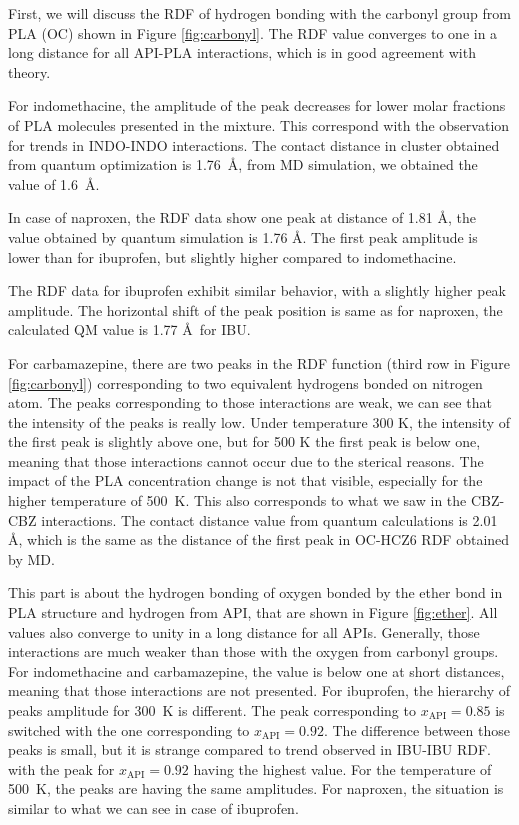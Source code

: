 \newpage
First, we will discuss the RDF of hydrogen bonding with the carbonyl group from PLA (OC) shown in Figure \ref{fig:carbonyl}. The RDF value converges to one in a long distance for all API-PLA interactions, which is in good agreement with theory. 

For indomethacine, the amplitude of the peak decreases for lower molar fractions of PLA molecules presented in the mixture. This correspond with the observation for trends in INDO-INDO interactions. The contact distance in cluster obtained from quantum optimization is 1.76~\AA, from MD simulation, we obtained the value of 1.6~\AA.

In case of naproxen, the RDF data show one peak at distance of 1.81 \AA, the value obtained by quantum simulation is 1.76 \AA. The first peak amplitude is lower than for ibuprofen, but slightly higher compared to indomethacine. 

The RDF data for ibuprofen exhibit similar behavior, with a slightly higher peak amplitude.   The horizontal shift of the peak position is same as for naproxen, the calculated QM value is 1.77 \AA~for IBU.


For carbamazepine, there are two peaks in the RDF function (third row in Figure \ref{fig:carbonyl}) corresponding to two equivalent hydrogens bonded on nitrogen atom. The peaks corresponding to those interactions are weak, we can see that the intensity of the peaks is really low. Under temperature 300 K, the intensity of the first peak is slightly above one, but for 500 K the first peak is below one, meaning that those interactions cannot occur due to the sterical reasons. The impact of the PLA concentration change is not that visible, especially for the higher temperature of 500~K. This also corresponds to what we saw in the CBZ-CBZ interactions. The contact distance value from quantum calculations is 2.01 \AA, which is the same as the distance of the first peak in OC-HCZ6 RDF obtained by MD.


This part is about the hydrogen bonding of oxygen bonded by the ether bond in PLA structure and hydrogen from API, that are shown in Figure \ref{fig:ether}. All values also converge to unity in a long distance for all APIs. Generally, those interactions are much weaker than those with the oxygen from carbonyl groups. For indomethacine and carbamazepine, the value is below one at short distances, meaning that those interactions are not presented. For ibuprofen, the hierarchy of peaks amplitude for 300~K is different. The peak corresponding to $x_\text{API}=0.85$ is switched with the one corresponding to $x_\text{API}=0.92$. The difference between those peaks is small, but it is strange compared to trend observed in IBU-IBU RDF. with the peak for $x_\text{API}=0.92$ having the highest value. For the temperature of 500~K, the peaks are having the same amplitudes. For naproxen, the situation is similar to what we can see in case of ibuprofen. 


